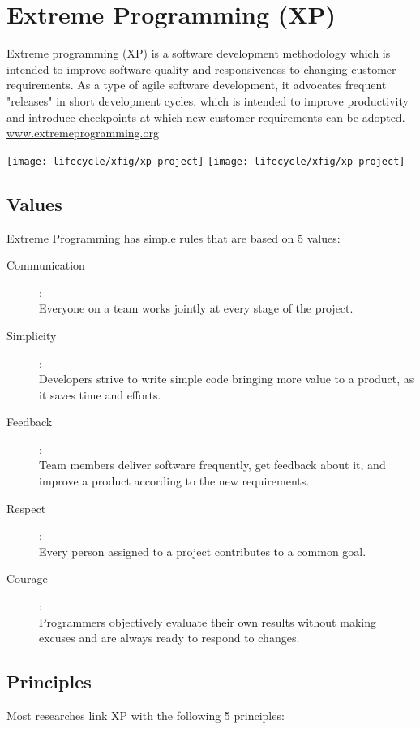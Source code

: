 \begin{minipage}[t]{0.5\linewidth}
\section{Extreme Programming (XP)}
Extreme programming (XP) is a software development methodology which is
intended to improve software quality and responsiveness to changing customer
requirements. As a type of agile software development,
it advocates frequent "releases" in short development cycles, which is
intended to improve productivity and introduce checkpoints at which new
customer requirements can be adopted. \href{https://www.extremeprogramming.org}
{www.extremeprogramming.org}
\begin{center}
\ifslides
\texttt{[image: lifecycle/xfig/xp-project]}
\else
\texttt{[image: lifecycle/xfig/xp-project]}
\fi
\end{center}

\subsection{Values}
Extreme Programming has simple rules that are based on 5 values:

\begin{description}
\item [Communication]:\\
Everyone on a team works jointly at every stage of the project.
\item  [Simplicity]:\\
Developers strive to write simple code bringing more value to a product, as it
saves time and efforts.
\item [Feedback]:\\
Team members deliver software frequently, get feedback about it, and improve a
product according to the new requirements.
\item [Respect]:\\
Every person assigned to a project contributes to a common goal.
\item [Courage]:\\
Programmers objectively evaluate their own results without making excuses and
are always ready to respond to changes.
\end{description}


\subsection{Principles}
Most researches link XP with the following 5 principles:


\end{minipage}
